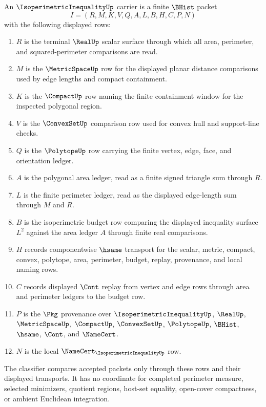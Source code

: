 \begin{definition}
\label{def:isoperimetric-inequality-carrier}
An $\IsoperimetricInequalityUp$ carrier is a finite $\BHist$ packet
$$
I=(R,M,K,V,Q,A,L,B,H,C,P,N)
$$
with the following displayed rows:
\begin{enumerate}
\item $R$ is the terminal $\RealUp$ scalar surface through which all area, perimeter, and squared-perimeter comparisons are read.
\item $M$ is the $\MetricSpaceUp$ row for the displayed planar distance comparisons used by edge lengths and compact containment.
\item $K$ is the $\CompactUp$ row naming the finite containment window for the inspected polygonal region.
\item $V$ is the $\ConvexSetUp$ comparison row used for convex hull and support-line checks.
\item $Q$ is the $\PolytopeUp$ row carrying the finite vertex, edge, face, and orientation ledger.
\item $A$ is the polygonal area ledger, read as a finite signed triangle sum through $R$.
\item $L$ is the finite perimeter ledger, read as the displayed edge-length sum through $M$ and $R$.
\item $B$ is the isoperimetric budget row comparing the displayed inequality surface $L^2$ against the area ledger $A$ through finite real comparisons.
\item $H$ records componentwise $\hsame$ transport for the scalar, metric, compact, convex, polytope, area, perimeter, budget, replay, provenance, and local naming rows.
\item $C$ records displayed $\Cont$ replay from vertex and edge rows through area and perimeter ledgers to the budget row.
\item $P$ is the $\Pkg$ provenance over $\IsoperimetricInequalityUp$, $\RealUp$, $\MetricSpaceUp$, $\CompactUp$, $\ConvexSetUp$, $\PolytopeUp$, $\BHist$, $\hsame$, $\Cont$, and $\NameCert$.
\item $N$ is the local $\NameCert_{\IsoperimetricInequalityUp}$ row.
\end{enumerate}
The classifier compares accepted packets only through these rows and their displayed transports. It has no coordinate for completed perimeter measure, selected minimizers, quotient regions, host-set equality, open-cover compactness, or ambient Euclidean integration.
\end{definition}


